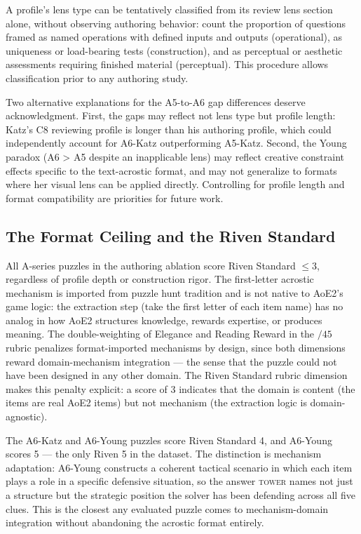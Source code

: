 A profile's lens type can be tentatively classified from its review lens section alone, without observing authoring behavior: count the proportion of questions framed as named operations with defined inputs and outputs (operational), as uniqueness or load-bearing tests (construction), and as perceptual or aesthetic assessments requiring finished material (perceptual). This procedure allows classification prior to any authoring study.

Two alternative explanations for the A5-to-A6 gap differences deserve acknowledgment. First, the gaps may reflect not lens type but profile length: Katz's C8 reviewing profile is longer than his authoring profile, which could independently account for A6-Katz outperforming A5-Katz. Second, the Young paradox (A6 > A5 despite an inapplicable lens) may reflect creative constraint effects specific to the text-acrostic format, and may not generalize to formats where her visual lens can be applied directly. Controlling for profile length and format compatibility are priorities for future work.

\subsection{The Format Ceiling and the Riven Standard}

All A-series puzzles in the authoring ablation score Riven Standard $\leq 3$, regardless of profile depth or construction rigor. The first-letter acrostic mechanism is imported from puzzle hunt tradition and is not native to AoE2's game logic: the extraction step (take the first letter of each item name) has no analog in how AoE2 structures knowledge, rewards expertise, or produces meaning. The double-weighting of Elegance and Reading Reward in the $/45$ rubric penalizes format-imported mechanisms by design, since both dimensions reward domain-mechanism integration — the sense that the puzzle could not have been designed in any other domain. The Riven Standard rubric dimension makes this penalty explicit: a score of 3 indicates that the domain is content (the items are real AoE2 items) but not mechanism (the extraction logic is domain-agnostic).

The A6-Katz and A6-Young puzzles score Riven Standard 4, and A6-Young scores 5 — the only Riven 5 in the dataset. The distinction is mechanism adaptation: A6-Young constructs a coherent tactical scenario in which each item plays a role in a specific defensive situation, so the answer \textsc{tower} names not just a structure but the strategic position the solver has been defending across all five clues. This is the closest any evaluated puzzle comes to mechanism-domain integration without abandoning the acrostic format entirely.

